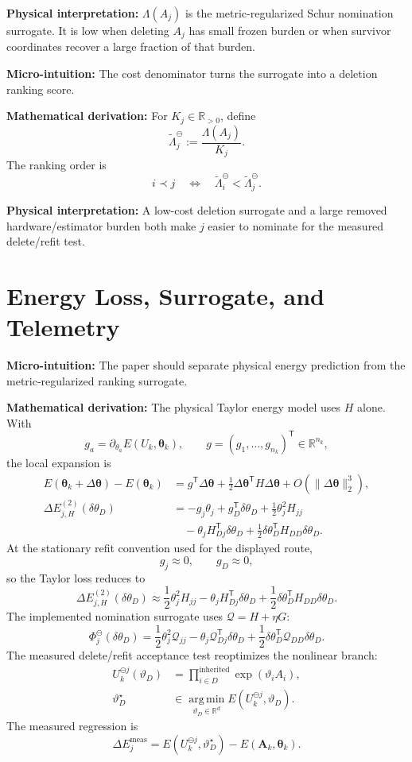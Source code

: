 \documentclass[10pt,twocolumn]{article}
\newcommand{\blocktitle}[1]{\vspace{2pt}\noindent\textbf{#1}\space}
\newcommand{\micro}[1]{\blocktitle{Micro-intuition:} #1}
\newcommand{\deriv}{\blocktitle{Mathematical derivation:}}
\newcommand{\phys}[1]{\blocktitle{Physical interpretation:} #1}
\begin{document}
\phys{\(\Lambda(A_j)\) is the metric-regularized Schur nomination surrogate. It is low when deleting \(A_j\) has small frozen burden or when survivor coordinates recover a large fraction of that burden.}

\micro{The cost denominator turns the surrogate into a deletion ranking score.}

\deriv
For \(K_j\in\mathbb R_{>0}\), define
\[
\widetilde{\Lambda}_j^\ominus
:=
\frac{\Lambda(A_j)}{K_j}.
\]
The ranking order is
\[
i\prec j
\quad\Longleftrightarrow\quad
\widetilde{\Lambda}_i^\ominus
<
\widetilde{\Lambda}_j^\ominus .
\]

\phys{A low-cost deletion surrogate and a large removed hardware/estimator burden both make \(j\) easier to nominate for the measured delete/refit test.}

\section*{Energy Loss, Surrogate, and Telemetry}

\micro{The paper should separate physical energy prediction from the metric-regularized ranking surrogate.}

\deriv
The physical Taylor energy model uses \(H\) alone. With
\[
g_a=\partial_{\theta_a}E(U_k,\boldsymbol\theta_k),
\qquad
g=(g_1,\ldots,g_{n_k})^{\mathsf T}\in\mathbb R^{n_k},
\]
the local expansion is
\[
\begin{aligned}
E(\boldsymbol\theta_k+\Delta\boldsymbol\theta)
-
E(\boldsymbol\theta_k)
&=
g^{\mathsf T}\Delta\boldsymbol\theta
+
\frac12
\Delta\boldsymbol\theta^{\mathsf T}H\Delta\boldsymbol\theta
+
O(\|\Delta\boldsymbol\theta\|_2^3),
\\
\Delta E_{j,H}^{(2)}(\delta\theta_D)
&=
-g_j\theta_j
+
g_D^{\mathsf T}\delta\theta_D
+
\frac12\theta_j^2H_{jj}
\\
&\quad
-\theta_jH_{Dj}^{\mathsf T}\delta\theta_D
+
\frac12\delta\theta_D^{\mathsf T}H_{DD}\delta\theta_D .
\end{aligned}
\]
At the stationary refit convention used for the displayed route,
\[
g_j\approx0,
\qquad
g_D\approx0,
\]
so the Taylor loss reduces to
\[
\Delta E_{j,H}^{(2)}(\delta\theta_D)
\approx
\frac12\theta_j^2H_{jj}
-\theta_jH_{Dj}^{\mathsf T}\delta\theta_D
+\frac12\delta\theta_D^{\mathsf T}H_{DD}\delta\theta_D .
\]
The implemented nomination surrogate uses \(\mathcal Q=H+\eta G\):
\[
\Phi_j^\ominus(\delta\theta_D)
=
\frac12\theta_j^2\mathcal Q_{jj}
-\theta_j\mathcal Q_{Dj}^{\mathsf T}\delta\theta_D
+\frac12\delta\theta_D^{\mathsf T}\mathcal Q_{DD}\delta\theta_D.
\]
The measured delete/refit acceptance test reoptimizes the nonlinear branch:
\[
\begin{aligned}
U_k^{\ominus j}(\vartheta_D)
&=
\prod_{i\in D}^{\mathrm{inherited}}
\exp(\vartheta_iA_i),
\\
\vartheta_D^\star
&\in
\operatorname*{arg\,min}_{\vartheta_D\in\mathbb R^d}
E(U_k^{\ominus j},\vartheta_D).
\end{aligned}
\]
The measured regression is
\[
\Delta E_j^{\mathrm{meas}}
=
E(U_k^{\ominus j},\vartheta_D^\star)
-
E(\mathbf A_k,\boldsymbol\theta_k).
\]
\end{document}
